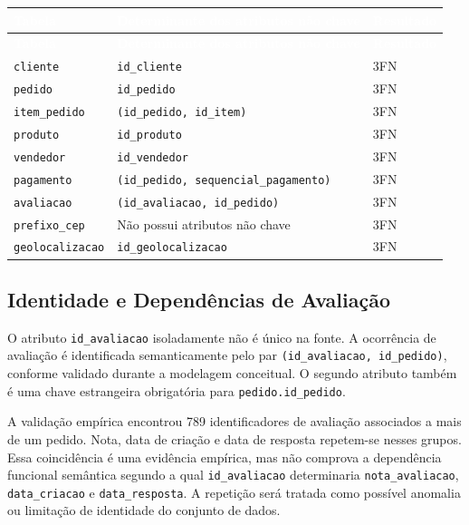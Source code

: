 \documentclass[12pt,a4paper]{article}
\begin{document}
	{\small
		\renewcommand{\arraystretch}{1.4}
		\begin{longtable}{|>{\raggedright\arraybackslash}p{2.7cm}|>{\raggedright\arraybackslash}p{8.4cm}|>{\raggedright\arraybackslash}p{3.0cm}|}
			\hline
			\rowcolor{AzulCorporativo}
			\textcolor{white}{\textbf{Tabela}} & \textcolor{white}{\textbf{Determinante dos atributos não chave}} & \textcolor{white}{\textbf{Resultado}} \\ \hline
			\endfirsthead
			\hline
			\rowcolor{AzulCorporativo}
			\textcolor{white}{\textbf{Tabela}} & \textcolor{white}{\textbf{Determinante dos atributos não chave}} & \textcolor{white}{\textbf{Resultado}} \\ \hline
			\endhead
			\texttt{cliente} & \texttt{id\_cliente} & 3FN \\ \hline
			\texttt{pedido} & \texttt{id\_pedido} & 3FN \\ \hline
			\texttt{item\_pedido} & \texttt{(id\_pedido, id\_item)} & 3FN \\ \hline
			\texttt{produto} & \texttt{id\_produto} & 3FN \\ \hline
			\texttt{vendedor} & \texttt{id\_vendedor} & 3FN \\ \hline
			\texttt{pagamento} & \texttt{(id\_pedido, sequencial\_pagamento)} & 3FN \\ \hline
			\texttt{avaliacao} & \texttt{(id\_avaliacao, id\_pedido)} & 3FN \\ \hline
			\texttt{prefixo\_cep} & Não possui atributos não chave & 3FN \\ \hline
			\texttt{geolocalizacao} & \texttt{id\_geolocalizacao} & 3FN \\ \hline
	\end{longtable}}

	\subsection{Identidade e Dependências de Avaliação}

	O atributo \texttt{id\_avaliacao} isoladamente não é único na fonte. A
	ocorrência de avaliação é identificada semanticamente pelo par
	\texttt{(id\_avaliacao, id\_pedido)}, conforme validado durante a modelagem conceitual. O segundo
	atributo também é uma chave estrangeira obrigatória para
	\texttt{pedido.id\_pedido}.

	A validação empírica encontrou 789 identificadores de avaliação associados a
	mais de um pedido. Nota, data de criação e data de resposta repetem-se nesses
	grupos. Essa coincidência é uma evidência empírica, mas não comprova a
	dependência funcional semântica segundo a qual \texttt{id\_avaliacao}
	determinaria \texttt{nota\_avaliacao}, \texttt{data\_criacao} e
	\texttt{data\_resposta}. A repetição será tratada como possível anomalia ou limitação de identidade do conjunto de dados.
\end{document}
